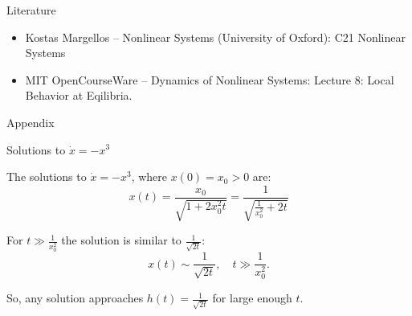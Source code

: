 \documentclass{beamer}
\begin{document}
\begin{frame}{Literature}

\begin{itemize}
	
	\item Kostas Margellos -- Nonlinear Systems (University of Oxford): 
	{C21 Nonlinear Systems}
	
	
	\item MIT OpenCourseWare -- Dynamics of Nonlinear Systems: 
	{Lecture 8: Local Behavior at Eqilibria.}
	
	
	
\end{itemize}

\end{frame}



\myqrframe



\begin{frame}

{\Large Appendix}

\end{frame}


\begin{frame}{Solutions to $\dot{x}=-x^3$}
	\begin{flushleft}
		
		The solutions to $\dot{x}=-x^3$, where $x(0) = x_0 > 0$ are:
		\[
		x(t)
		=
		\frac{x_0}
		{\sqrt{1+2 x_0^2t}} 
		= 
		\frac{1}
		{\sqrt{\frac{1}{x_0^2}+2t}} 
		\]
		
		For $t \gg \frac{1}{x_0^2}$ the solution is similar to $\frac{1}{\sqrt{2t}}$:
		\[
		x(t)
		\sim
		\frac{1}{\sqrt{2t}}, \quad t \gg \frac{1}{x_0^2}.
		\]
		
		So, any solution approaches $h(t) = \frac{1}{\sqrt{2t}}$ for large enough $t$.
		
	\end{flushleft}
\end{frame}
\end{document}
